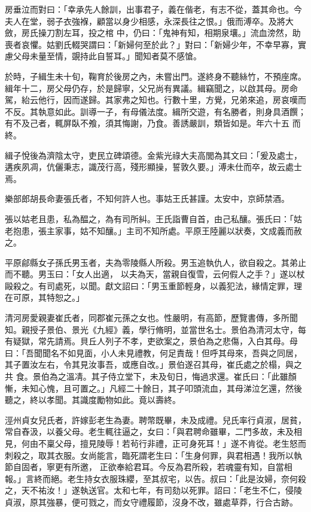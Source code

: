\begin{pinyinscope}
 房垂泣而對曰：「幸承先人餘訓，出事君子，義在偕老，有志不從，蓋其命也。今夫人在堂，弱子衣強褓，顧當以身少相感，永深長往之恨。」俄而溥卒。及將大斂，房氏操刀割左耳，投之棺
 中，仍曰：「鬼神有知，相期泉壤。」流血滂然，助喪者哀懼。姑劉氏輟哭謂曰：「新婦何至於此？」對曰：「新婦少年，不幸早寡，實慮父母未量至情，覬持此自誓耳。」聞知者莫不感愴。



 於時，子緝生未十旬，鞠育於後房之內，未嘗出門。遂終身不聽絲竹，不預座席。緝年十二，房父母仍存，於是歸寧，父兄尚有異議。緝竊聞之，以啟其母。房命駕，紿云他行，因而遂歸。其家弗之知也。行數十里，方覺，兄弟來追，房哀嘆而不反。其執意如此。訓導一子，有母儀法度。緝所交遊，有名勝者，則身具酒饌；有不及己者，輒屏臥不飧，須其悔謝，乃食。善誘嚴訓，類皆如是。年六十五
 而終。



 緝子悅後為濟陰太守，吏民立碑頌德。金紫光祿大夫高閭為其文曰：「爰及處士，遘疾夙凋，伉儷秉志，識茂行高，殘形顯操，誓敦久要。」溥未仕而卒，故云處士焉。



 樂部郎胡長命妻張氏者，不知何許人也。事姑王氏甚謹。太安中，京師禁酒。



 張以姑老且患，私為醖之，為有司所糾。王氏詣曹自首，由己私釀。張氏曰：「姑老抱患，張主家事，姑不知釀。」主司不知所處。平原王陸麗以狀奏，文成義而赦之。



 平原鄃縣女子孫氏男玉者，夫為零陵縣人所殺。男玉追執仇人，欲自殺之。其弟止而不聽。男玉曰：「女人出適，
 以夫為天，當親自復雪，云何假人之手？」遂以杖毆殺之。有司處死，以聞。獻文詔曰：「男玉重節輕身，以義犯法，緣情定罪，理在可原，其特恕之。」



 清河房愛親妻崔氏者，同郡崔元孫之女也。性嚴明，有高節，歷覽書傳，多所聞知。親授子景伯、景光《九經》義，學行脩明，並當世名士。景伯為清河太守，每有疑獄，常先請焉。貝丘人列子不孝，吏欲案之，景伯為之悲傷，入白其母。母曰：「吾聞聞名不如見面，小人未見禮教，何足責哉！但呼其母來，吾與之同居，其子置汝左右，令其見汝事吾，或應自改。」景伯遂召其母，崔氏處之於榻，與之共
 食。景伯為之溫凊。其子侍立堂下，未及旬日，悔過求還。崔氏曰：「此雖顏慚，未知心愧，且可置之。」凡經二十餘日，其子叩頭流血，其母涕泣乞還，然後聽之，終以孝聞。其識度勵物如此。竟以壽終。



 涇州貞女兒氏者，許嫁彭老生為妻。聘幣既畢，未及成禮。兒氏率行貞淑，居貧，常自舂汲，以養父母。老生輒往逼之，女曰：「與君聘命雖畢，二門多故，未及相見，何由不稟父母，擅見陵辱！若茍行非禮，正可身死耳！」遂不肯從。老生怒而刺殺之，取其衣服。女尚能言，臨死謂老生曰：「生身何罪，與君相遇！我所以執節自固者，寧更有所邀，
 正欲奉給君耳。今反為君所殺，若魂靈有知，自當相報。」言終而絕。老生持女衣服珠纓，至其叔宅，以告。叔曰：「此是汝婦，奈何殺之，天不祐汝！」遂執送官。太和七年，有司劾以死罪。詔曰：「老生不仁，侵陵貞淑，原其強暴，便可戮之，而女守禮履節，沒身不改，雖處草莽，行合古跡。




\end{pinyinscope}
